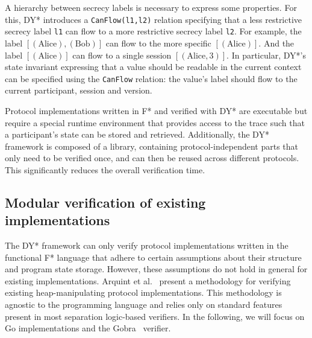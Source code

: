 A hierarchy between secrecy labels is necessary to express some properties. For this, DY* introduces a \texttt{CanFlow(l1,l2)} relation specifying that a less restrictive secrecy label \texttt{l1} can flow to a more restrictive secrecy label \texttt{l2}.
For example, the label $[(\text{Alice}), (\text{Bob})]$ can flow to the more specific $[(\text{Alice})]$. And the label $[(\text{Alice})]$ can flow to a single session $[(\text{Alice}, 3)]$.
In particular, DY*'s state invariant expressing that a value should be readable in the current context can be specified using the \texttt{CanFlow} relation: the value's label should flow to the current participant, session and version.

Protocol implementations written in F* and verified with DY* are executable but require a special runtime environment that provides access to the trace such that a participant's state can be stored and retrieved.
Additionally, the DY* framework is composed of a library, containing protocol-independent parts that only need to be verified once, and can then be reused across different protocols. This significantly reduces the overall verification time.

\subsection{Modular verification of existing implementations}
\label{sec:modular-verification-of-existing-implementations}

The DY* framework can only verify protocol implementations written in the functional F* language that adhere to certain assumptions about their structure and program state storage.
However, these assumptions do not hold in general for existing implementations.
Arquint et al.~\cite{ArquintSchwerhoffMehtaMueller23} present a methodology for verifying existing heap-manipulating protocol implementations. This methodology is agnostic to the programming language and relies only on standard features present in most separation logic-based verifiers. In the following, we will focus on Go implementations and the Gobra~\cite{wolf2021gobra} verifier.

